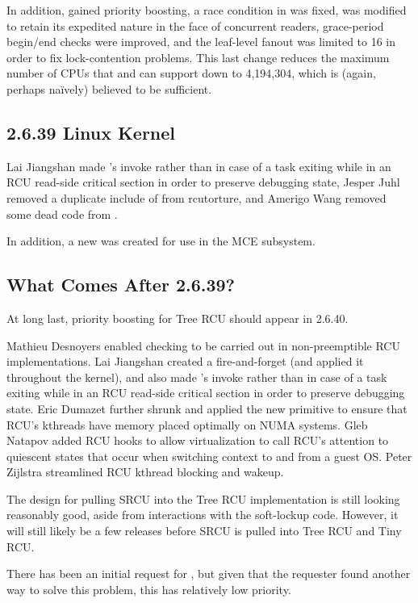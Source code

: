 In addition,  gained priority boosting, a race condition
in  was fixed,
 was modified to retain its expedited
nature in the face of concurrent readers,
grace-period begin/end checks were improved,
and the  leaf-level fanout was limited to 16 in order to fix
lock-contention problems.
This last change reduces the maximum number of CPUs that 
and  can support down to 4,194,304, which is
(again, perhaps na\"ively) believed to be sufficient.

\subsection{2.6.39 Linux Kernel}

Lai Jiangshan made 's  invoke
rather than  in case of a task exiting while
in an RCU read-side critical section in order to preserve debugging
state,
Jesper Juhl removed a duplicate include of  from
rcutorture,
and
Amerigo Wang removed some dead code from .

In addition, a new  was created for use in the
MCE subsystem.

\subsection{What Comes After 2.6.39?}

At long last, priority boosting for Tree RCU should appear in 2.6.40.

Mathieu Desnoyers enabled  checking to
be carried out in non-preemptible RCU implementations.
Lai Jiangshan created a fire-and-forget  (and applied
it throughout the kernel),
and also made 's  invoke
rather than  in case of a task exiting while
in an RCU read-side critical section in order to preserve debugging
state.
Eric Dumazet further shrunk  and applied the new
 primitive to ensure that RCU's
kthreads have memory placed optimally on NUMA systems.
Gleb Natapov added RCU hooks to allow virtualization to call RCU's
attention to quiescent states that occur when switching context to
and from a guest OS.
Peter Zijlstra streamlined RCU kthread blocking and wakeup.

The design for pulling SRCU into the Tree RCU implementation is still
looking reasonably good, aside from interactions with the soft-lockup code.
However, it will still likely be a few releases before SRCU is pulled
into Tree RCU and Tiny RCU.

There has been an initial request for ,
but given that the requester found another way to solve this problem,
this has relatively low priority.
